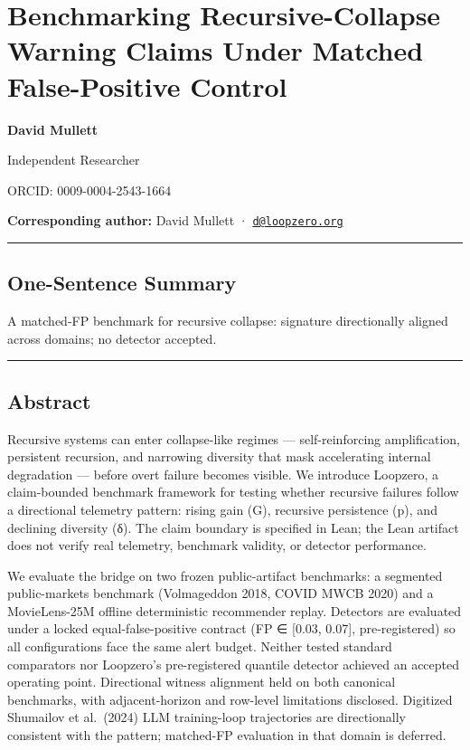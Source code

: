 \documentclass[
  11pt,
]{article}
\author{}
\date{}
\begin{document}
\section{Benchmarking Recursive-Collapse Warning Claims Under Matched
False-Positive
Control}\label{benchmarking-recursive-collapse-warning-claims-under-matched-false-positive-control}

\textbf{David Mullett}

Independent Researcher

ORCID: 0009-0004-2543-1664

\textbf{Corresponding author:} David Mullett ·
\href{mailto:d@loopzero.org}{\nolinkurl{d@loopzero.org}}

\begin{center}\rule{0.5\linewidth}{0.5pt}\end{center}

\subsection{One-Sentence Summary}\label{one-sentence-summary}

A matched-FP benchmark for recursive collapse: signature directionally
aligned across domains; no detector accepted.

\begin{center}\rule{0.5\linewidth}{0.5pt}\end{center}

\subsection{Abstract}\label{abstract}

Recursive systems can enter collapse-like regimes --- self-reinforcing
amplification, persistent recursion, and narrowing diversity that mask
accelerating internal degradation --- before overt failure becomes
visible. We introduce Loopzero, a claim-bounded benchmark framework for
testing whether recursive failures follow a directional telemetry
pattern: rising gain (G), recursive persistence (p), and declining
diversity (δ). The claim boundary is specified in Lean; the Lean
artifact does not verify real telemetry, benchmark validity, or detector
performance.

We evaluate the bridge on two frozen public-artifact benchmarks: a
segmented public-markets benchmark (Volmageddon 2018, COVID MWCB 2020)
and a MovieLens-25M offline deterministic recommender replay. Detectors
are evaluated under a locked equal-false-positive contract (FP ∈
{[}0.03, 0.07{]}, pre-registered) so all configurations face the same
alert budget. Neither tested standard comparators nor Loopzero's
pre-registered quantile detector achieved an accepted operating point.
Directional witness alignment held on both canonical benchmarks, with
adjacent-horizon and row-level limitations disclosed. Digitized
Shumailov et al.~(2024) LLM training-loop trajectories are directionally
consistent with the pattern; matched-FP evaluation in that domain is
deferred.
\end{document}
